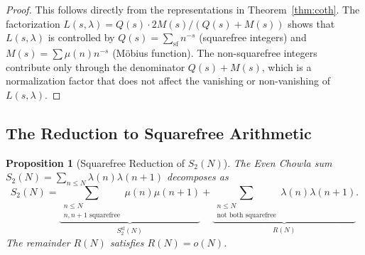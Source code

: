 \documentclass[11pt,a4paper]{article}
\theoremstyle{plain}
\newtheorem{proposition}[theorem]{Proposition}
\theoremstyle{definition}
\begin{document}
\begin{proof}
This follows directly from the representations in Theorem~\ref{thm:coth}. The factorization $L(s,\lambda) = Q(s) \cdot 2M(s)/(Q(s) + M(s))$ shows that $L(s,\lambda)$ is controlled by $Q(s) = \sum_{\text{sf}} n^{-s}$ (squarefree integers) and $M(s) = \sum \mu(n) n^{-s}$ (M\"obius function). The non-squarefree integers contribute only through the denominator $Q(s) + M(s)$, which is a normalization factor that does not affect the vanishing or non-vanishing of $L(s,\lambda)$.
\end{proof}

\subsection{The Reduction to Squarefree Arithmetic}

\begin{proposition}[Squarefree Reduction of $S_2(N)$]\label{prop:squarefree-reduction}
The Even Chowla sum $S_2(N) = \sum_{n \leq N} \lambda(n)\lambda(n+1)$ decomposes as
\begin{equation}\label{eq:sf-decomp}
S_2(N) = \underbrace{\sum_{\substack{n \leq N \\ n, n+1 \text{ squarefree}}} \mu(n)\mu(n+1)}_{S_2^{\mathrm{sf}}(N)} + \underbrace{\sum_{\substack{n \leq N \\ \text{not both squarefree}}} \lambda(n)\lambda(n+1)}_{R(N)}.
\end{equation}
The remainder $R(N)$ satisfies $R(N) = o(N)$.
\end{proposition}
\end{document}
